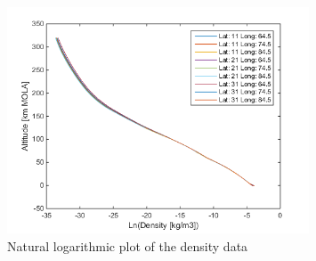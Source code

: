 \begin{figure}[H]
\centering
\includegraphics[width=0.8\textwidth]{figures/software/lnPlotDataDen.png}
\caption{Natural logarithmic plot of the density data}
\label{fig:lnPlotDataDen}
\end{figure}





%


%

